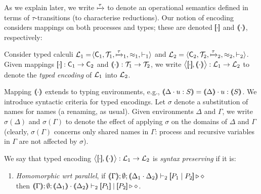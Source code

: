 \documentclass[runningheads]{llncs}
\begin{document}
{{%

As we explain later, we write $\xmapsto{\tau}$ to denote an operational semantics defined in terms of
$\tau$-transitions (to characterise reductions).
Our notion of encoding considers mappings on both processes 
and types; these are denoted $[\!\![\cdot]\!\!]$ and $(\!\!\langle\cdot\rangle\!\!)$, respectively: %

\begin{definition}%
\label{def:tenc}
        Consider typed calculi
        $\mathcal{L}_1=\!\langle \mathsf{C}_1, {\cal{T}}_1, \xmapsto{\tau}_1, \approx_1, \vdash_1 \rangle$
        and
        $\mathcal{L}_2=\langle \mathsf{C}_2, {\cal{T}}_2, \xmapsto{\tau}_2, \approx_2, \vdash_2 \rangle$.
	Given mappings $[\!\![\cdot]\!\!]: \mathsf{C}_1 \to \mathsf{C}_2$ and
	$(\!\!\langle\cdot\rangle\!\!): {\cal{T}}_1 \to {\cal{T}}_2$, 
	we write 
		$\enco{\map{\cdot}, \mapt{\cdot}} : 
	\tyl{L}_1 \to \tyl{L}_2$ to denote the \emph{typed encoding} of $\mathcal{L}_1$ into $\mathcal{L}_2$.
\end{definition}


Mapping $(\!\!\langle\cdot\rangle\!\!)$ extends to typing
environments, e.g., $\mapt{\Delta \cat u:S} = \mapt{\Delta} \cat u:\mapt{S}$.
We introduce syntactic criteria for typed encodings.
Let $\sigma$ denote a substitution of names for names (a renaming, as usual). Given environments $\Delta$ and $\Gamma$,
we write $\sigma(\Delta)$ and $\sigma(\Gamma)$ to denote the effect of applying $\sigma$ on the 
domains of $\Delta$ and $\Gamma$
(clearly, $\sigma(\Gamma)$ concerns only shared names in $\Gamma$: process and recursive variables in $\Gamma$ are not affected by $\sigma$). 


\begin{definition}%
	\label{def:sep}
	We say that 
	typed encoding 
	$\enco{\map{\cdot}, \mapt{\cdot}}: \tyl{L}_1 \to \tyl{L}_2$ is \emph{syntax preserving}
	if it is:
	
	\begin{enumerate}[1.]
		\item	\emph{Homomorphic wrt parallel},   if 
		$\mapt{\Gamma}; \emptyset; \mapt{\Delta_1 \cat \Delta_2} \proves_2 \map{P_1 \Par P_2} \hastype \Proc$ \\
		then 
		$\mapt{\Gamma}; \emptyset; \mapt{\Delta_1} \cat \mapt{\Delta_2} \proves_2 \map{P_1} \Par \map{P_2} \hastype \Proc$.


\end{enumerate}
\end{definition}}}
\end{document}
